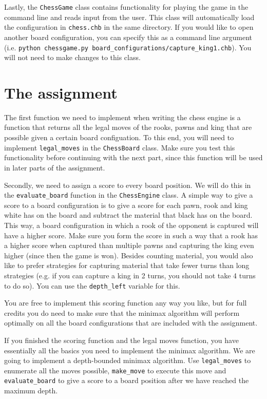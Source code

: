\documentclass[10pt]{scrartcl}
\begin{document}
Lastly, the \texttt{ChessGame} class contains functionality for playing the game in the command line and reads input from the user. This class will automatically load the configuration in \texttt{chess.chb} in the same directory. If you would like to open another board configuration, you can specify this as a command line argument (i.e. \texttt{python chessgame.py board\_configurations/capture\_king1.chb}). You will not need to make changes to this class.


\section*{The assignment}
The first function we need to implement when writing the chess engine is a function that returns all the legal moves of the rooks, pawns and king that are possible given a certain board configuation. To this end, you will need to implement \texttt{legal\_moves} in the \texttt{ChessBoard} class. Make sure you test this functionality before continuing with the next part, since this function will be used in later parts of the assignment.


Secondly, we need to assign a score to every board position. We will do this in the \texttt{evaluate\_board} function in the \texttt{ChessEngine} class. A simple way to give a score to a board configuration is to give a score for each pawn, rook and king white has on the board and subtract the material that black has on the board. This way, a board configuration in which a rook of the opponent is captured will have a higher score. Make sure you form the score in such a way that a rook has a higher score when captured than multiple pawns and capturing the king even higher (since then the game is won).
Besides counting material, you would also like to prefer strategies for capturing material that take fewer turns than long strategies (e.g. if you can capture a king in 2 turns, you should not take 4 turns to do so). You can use the \texttt{depth\_left} variable for this.

You are free to implement this scoring function any way you like, but for full credits you do need to make sure that the minimax algorithm will perform optimally on all the board configurations that are included with the assignment.

If you finished the scoring function and the legal moves function, you have essentially all the basics you need to implement the minimax algorithm. We are going to implement a depth-bounded minimax algorithm.  Use \texttt{legal\_moves} to enumerate all the moves possible, \texttt{make\_move} to execute this move and \texttt{evaluate\_board} to give a score to a board position after we have reached the maximum depth.
\end{document}
